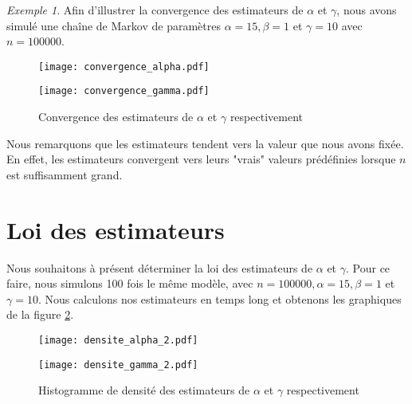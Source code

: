 \documentclass[12pt,a4paper]{report}
\theoremstyle{remark}
\newtheorem*{example}{Exemple}
\begin{document}
\begin{example}\label{exemple_convergence}
Afin d'illustrer la convergence des estimateurs de $\alpha$ et $\gamma$, nous avons simulé une chaîne de Markov de paramètres $\alpha =15, \beta = 1$ et $\gamma =10$ avec $n=100 000$.

\begin{figure}[h]
 \begin{minipage}[c]{0.25\linewidth}
        \centering
        \texttt{[image: convergence\_alpha.pdf]}
    \end{minipage}
    \hfill%
    \vspace{0.1cm}
    \begin{minipage}[c]{0.50\linewidth}
        \centering
       \texttt{[image: convergence\_gamma.pdf]}
    \end{minipage}
    \caption{Convergence des estimateurs de $\alpha$ et $\gamma$ respectivement}
    \label{convergence}
\end{figure}

Nous remarquons que les estimateurs tendent vers la valeur que nous avons fixée. En effet, les estimateurs convergent vers leurs "vrais" valeurs prédéfinies lorsque $n$ est suffisamment grand.
\end{example}

\newpage
\section{Loi des estimateurs}
\vspace{0.6cm}

Nous souhaitons à présent déterminer la loi des estimateurs de $\alpha$ et $\gamma$.
Pour ce faire, nous simulons 100 fois le même modèle, avec $n=100 000, \alpha=15, \beta=1$ et $\gamma=10$. Nous calculons nos estimateurs en temps long et obtenons les graphiques de la figure \ref{hist}.

\begin{figure}[h]
 \begin{minipage}[c]{0.25\linewidth}
        \centering
        \texttt{[image: densite\_alpha\_2.pdf]}
    \end{minipage}
    \hfill%
    \vspace{0.1cm}
    \begin{minipage}[c]{0.50\linewidth}
        \centering
       \texttt{[image: densite\_gamma\_2.pdf]}
    \end{minipage}
    \caption{Histogramme de densité des estimateurs de $\alpha$ et $\gamma$ respectivement}
    \label{hist}
\end{figure}
\end{document}
